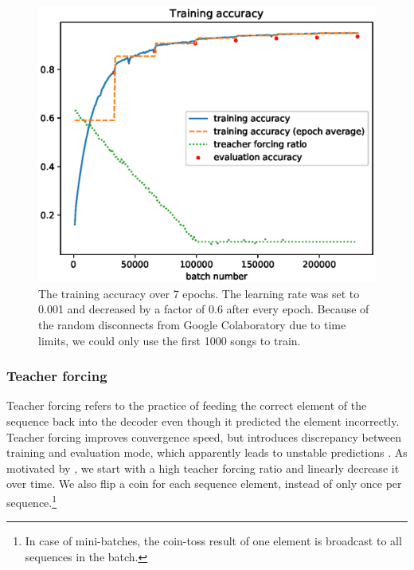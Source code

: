 \documentclass[a4paper]{article}
\begin{document}
\begin{figure}[h!]
  \includegraphics[width=\textwidth]{train/test-run}
  \caption{The training accuracy over 7 epochs. The learning rate was set to 0.001 and decreased by a factor of 0.6 after every epoch. Because of the random disconnects from Google Colaboratory due to time limits, we could only use the first 1000 songs to train.}
  \label{train-acc}
\end{figure}
 
\subsubsection{Teacher forcing}

Teacher forcing refers to the practice of feeding the correct element of the sequence back into the decoder even though it predicted the element incorrectly. Teacher forcing improves convergence speed, but introduces discrepancy between training and evaluation mode, which apparently leads to unstable predictions \cite{jaeger2002tutorial}. As motivated by \cite{bengio2015scheduled}, we start with a high teacher forcing ratio and linearly decrease it over time. We also flip a coin for each sequence element, instead of only once per sequence.\footnote{In case of mini-batches, the coin-toss result of one element is broadcast to all sequences in the batch.}



\end{document}
